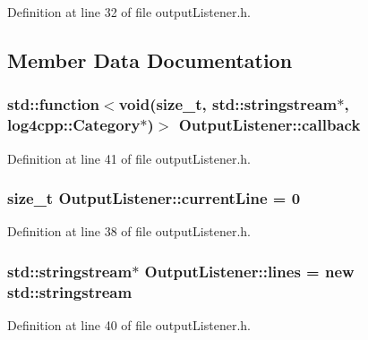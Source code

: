 Definition at line 32 of file output\+Listener.\+h.



\subsection{Member Data Documentation}
\subsubsection[{\texorpdfstring{callback}{callback}}]{\setlength{\rightskip}{0pt plus 5cm}std\+::function$<$void(size\+\_\+t, std\+::stringstream$\ast$, log4cpp\+::\+Category$\ast$)$>$ Output\+Listener\+::callback}\hypertarget{class_output_listener_a1749d1674b76f5bd22100ee16cfc1d9c}{}\label{class_output_listener_a1749d1674b76f5bd22100ee16cfc1d9c}


Definition at line 41 of file output\+Listener.\+h.

\subsubsection[{\texorpdfstring{current\+Line}{currentLine}}]{\setlength{\rightskip}{0pt plus 5cm}size\+\_\+t Output\+Listener\+::current\+Line = 0}\hypertarget{class_output_listener_a83775110ce744596cb13189417d5485d}{}\label{class_output_listener_a83775110ce744596cb13189417d5485d}


Definition at line 38 of file output\+Listener.\+h.

\subsubsection[{\texorpdfstring{lines}{lines}}]{\setlength{\rightskip}{0pt plus 5cm}std\+::stringstream$\ast$ Output\+Listener\+::lines = new std\+::stringstream}\hypertarget{class_output_listener_adaba1b44274920c6763bf479db77b7db}{}\label{class_output_listener_adaba1b44274920c6763bf479db77b7db}


Definition at line 40 of file output\+Listener.\+h.

